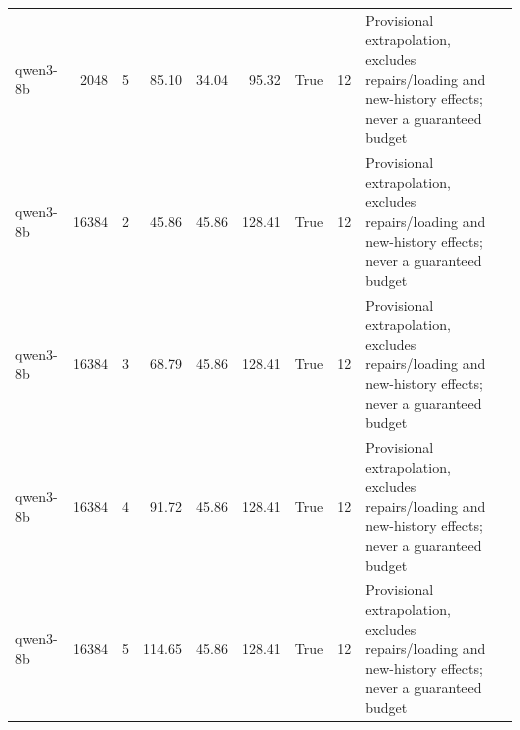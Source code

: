 \begin{tabular}{lrrrrrrrl}
qwen3-8b & 2048 & 5 & 85.10 & 34.04 & 95.32 & True & 12 & Provisional extrapolation, excludes repairs/loading and new-history effects; never a guaranteed budget \\
qwen3-8b & 16384 & 2 & 45.86 & 45.86 & 128.41 & True & 12 & Provisional extrapolation, excludes repairs/loading and new-history effects; never a guaranteed budget \\
qwen3-8b & 16384 & 3 & 68.79 & 45.86 & 128.41 & True & 12 & Provisional extrapolation, excludes repairs/loading and new-history effects; never a guaranteed budget \\
qwen3-8b & 16384 & 4 & 91.72 & 45.86 & 128.41 & True & 12 & Provisional extrapolation, excludes repairs/loading and new-history effects; never a guaranteed budget \\
qwen3-8b & 16384 & 5 & 114.65 & 45.86 & 128.41 & True & 12 & Provisional extrapolation, excludes repairs/loading and new-history effects; never a guaranteed budget \\
\bottomrule
\end{tabular}
